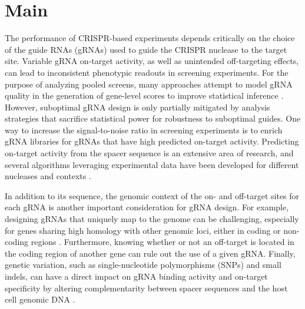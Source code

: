 \documentclass[pdftex,english,10pt]{article}
\begin{document}
\section{Main}


The performance of CRISPR-based experiments depends critically on the choice of the guide RNAs (gRNAs) used to guide the CRISPR nuclease to the target site.
Variable gRNA on-target activity, as well as unintended off-targeting effects, can lead to inconsistent phenotypic readouts in screening experiments. 
For the purpose of analyzing pooled screens, many approaches attempt to model gRNA quality in the generation of gene-level scores to improve statistical inference \citep{ceres, bagel2, chronos, jacks, mageckmle}. However, suboptimal gRNA design is only partially mitigated by analysis strategies that sacrifice statistical power for robustness to suboptimal guides. One way to increase the signal-to-noise ratio in screening experiments is to enrich gRNA libraries for gRNAs that have high predicted on-target activity.  Predicting on-target activity from the spacer sequence is an extensive area of research, and several algorithms leveraging experimental data have been developed for different nucleases and contexts \citep{doench2016optimized, doench2014rational,azimuth,deepcas9, deepcpf1,toronto, crisprscan, crispria}. 

In addition to its sequence, the genomic context of the on- and off-target sites for each gRNA is another important consideration for gRNA design. For example, designing gRNAs that uniquely map to the genome can be challenging, especially for genes sharing high homology with other genomic loci, either in coding or non-coding regions \citep{fortin2019}. Furthermore, knowing whether or not an off-target is located in the coding region of another gene can rule out the use of a given gRNA. Finally, genetic variation, such as single-nucleotide polymorphisms (SNPs) and small indels, can have a direct impact on gRNA binding activity and on-target specificity by altering complementarity between spacer sequences and the host cell genomic DNA \citep{scott2017implications, lessard2017human, canver2017variant, wang2018genetic}.
\end{document}
